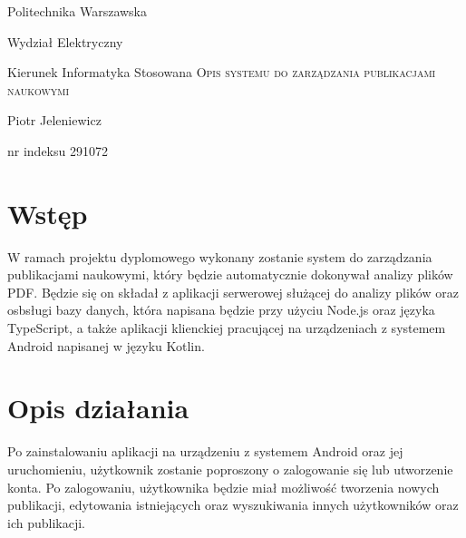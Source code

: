 \documentclass[8pt]{article}
\begin{document}
	\begin{titlepage}
		\begin{center}
			\Large
			Politechnika Warszawska 
			
			Wydział Elektryczny 
			
			Kierunek Informatyka Stosowana
			\vfill
			\Huge \textsc{Opis systemu  do zarządzania publikacjami naukowymi}
		\end{center}
		\vfill
		
		
		
		\begin{center}
			\Large Piotr Jeleniewicz
			
			nr indeksu 291072
		\end{center}
		
		
		
		
	\end{titlepage}
	\large\tableofcontents
	\Large
	\newpage

	
	\section {Wstęp}
		\hspace{10pt} W ramach projektu dyplomowego wykonany zostanie system do zarządzania publikacjami naukowymi, który będzie automatycznie dokonywał analizy plików PDF. Będzie się on składał z aplikacji serwerowej służącej do analizy plików oraz osbsługi bazy danych, która napisana będzie przy użyciu Node.js oraz języka TypeScript, a także aplikacji klienckiej pracującej na urządzeniach z systemem Android napisanej w języku Kotlin.
	\section {Opis działania}
		\hspace{10pt} Po zainstalowaniu aplikacji na urządzeniu z systemem Android oraz jej uruchomieniu, użytkownik zostanie poproszony o zalogowanie się lub utworzenie konta. Po zalogowaniu, użytkownika będzie miał możliwość tworzenia nowych publikacji, edytowania istniejących oraz wyszukiwania innych użytkowników oraz ich publikacji. 
\end{document}
